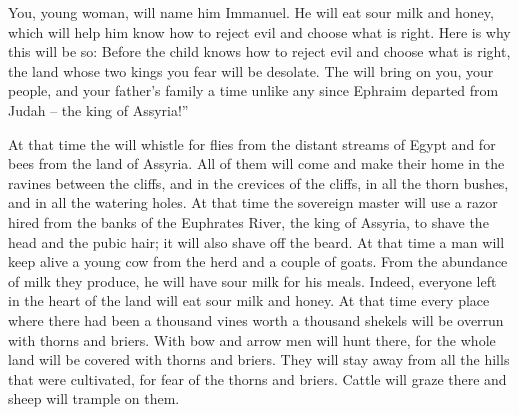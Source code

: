 {You, young woman, will name
him Immanuel.
He will eat
sour milk
and honey,
which will help him know
how to reject
evil
and choose
what is right.
Here is why this will be so: Before
the child
knows
how to reject
evil
and choose
what is right,
the land
whose
two
kings
you
fear will be desolate.
The
{}
will bring
on
you, your people,
and your father’s
family
a time
unlike
any since
Ephraim
departed
from
Judah
– the king
of Assyria!”
\par }{\PP {}At that
time
the {}
will whistle
for flies
from the distant
streams
of Egypt
and for bees
from the land
of Assyria.
All
of them will come
and make their home
in the ravines
between the cliffs,
and in the crevices
of the cliffs,
in all
the thorn bushes,
and in all
the watering holes.
At that time
the sovereign
master will use a razor
hired
from the banks
of the Euphrates River,
the king
of Assyria,
to shave
the head
and the pubic hair;
it will also
shave off
the beard.
At that time
a man
will keep alive
a young cow
from the herd
and a couple
of goats.
From the abundance
of milk
they produce,
he will have sour milk
for
his meals.
Indeed, everyone
left
in the heart
of the land
will eat
sour milk
and honey.
At that
time
every
place
where
there
had been a thousand
vines
worth a thousand
shekels
will be overrun
with thorns
and briers.
With bow
and arrow
men will hunt
there,
for
the whole
land
will be
covered with thorns
and briers.
They will stay away from all
the hills
that
were cultivated,
for fear
of the thorns
and briers.
Cattle
will graze
there and sheep
will trample on them.

\par }
